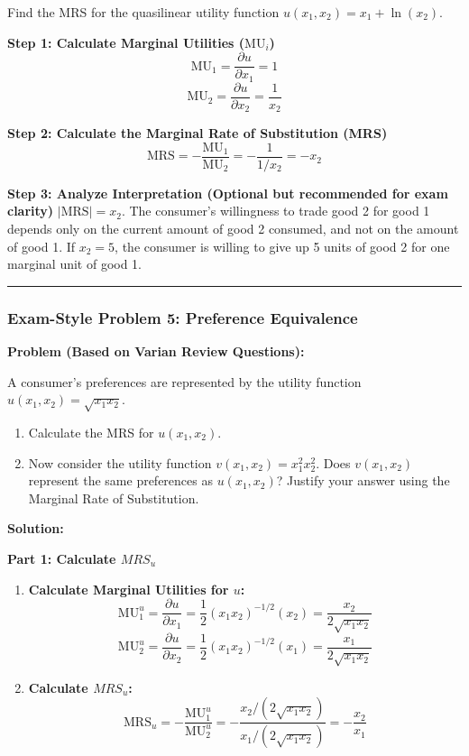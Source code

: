 \documentclass{article}
\begin{document}
Find the MRS for the quasilinear utility function $u(x_1, x_2) = x_1 + \ln(x_2)$.

\textbf{Step 1: Calculate Marginal Utilities ($\text{MU}_i$)}
\[ \text{MU}_1 = \frac{\partial u}{\partial x_1} = 1 \]
\[ \text{MU}_2 = \frac{\partial u}{\partial x_2} = \frac{1}{x_2} \]

\textbf{Step 2: Calculate the Marginal Rate of Substitution (MRS)}
\[\text{MRS} = -\frac{\text{MU}_1}{\text{MU}_2} = -\frac{1}{1/x_2} = -x_2\]

\textbf{Step 3: Analyze Interpretation (Optional but recommended for exam clarity)}
$|\text{MRS}| = x_2$. The consumer's willingness to trade good 2 for good 1 depends only on the current amount of good 2 consumed, and not on the amount of good 1. If $x_2=5$, the consumer is willing to give up 5 units of good 2 for one marginal unit of good 1.

\noindent\rule{\linewidth}{0.4pt}

\subsubsection*{Exam-Style Problem 5: Preference Equivalence}

\textbf{Problem (Based on Varian Review Questions):}

A consumer's preferences are represented by the utility function $u(x_1, x_2) = \sqrt{x_1 x_2}$.
\begin{enumerate}
    \item Calculate the MRS for $u(x_1, x_2)$.
    \item Now consider the utility function $v(x_1, x_2) = x_1^2 x_2^2$. Does $v(x_1, x_2)$ represent the same preferences as $u(x_1, x_2)$? Justify your answer using the Marginal Rate of Substitution.
\end{enumerate}

\textbf{Solution:}

\textbf{Part 1: Calculate $MRS_u$}
\begin{enumerate}
    \item \textbf{Calculate Marginal Utilities for $u$:}
    \[ \text{MU}_1^u = \frac{\partial u}{\partial x_1} = \frac{1}{2}(x_1 x_2)^{-1/2} (x_2) = \frac{x_2}{2\sqrt{x_1 x_2}} \]
    \[ \text{MU}_2^u = \frac{\partial u}{\partial x_2} = \frac{1}{2}(x_1 x_2)^{-1/2} (x_1) = \frac{x_1}{2\sqrt{x_1 x_2}} \]
    \item \textbf{Calculate $MRS_u$:}
    \[ \text{MRS}_u = -\frac{\text{MU}_1^u}{\text{MU}_2^u} = -\frac{x_2 / (2\sqrt{x_1 x_2})}{x_1 / (2\sqrt{x_1 x_2})} = -\frac{x_2}{x_1} \]
\end{enumerate}
\end{document}
